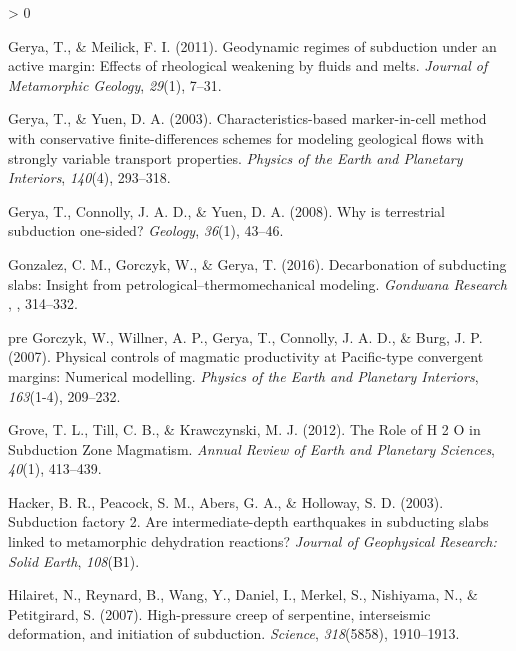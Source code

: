 \documentclass[draft,linenumbers]{agujournal2018}
\newlength{\cslhangindent}
\newenvironment{CSLReferences}[2] %
 {%
  \setlength{\parindent}{0pt}
  \ifodd #1 \everypar{\setlength{\hangindent}{\cslhangindent}}\ignorespaces\fi
  \ifnum #2 > 0
  \setlength{\parskip}{#2\baselineskip}
  \fi
 }%
 {}
\providecommand{\DIFaddtex}[1]{{\protect\color{blue} \sf #1}} %
\providecommand{\DIFaddbegin}{} %
\providecommand{\DIFaddend}{} %
\providecommand{\DIFadd}[1]{\texorpdfstring{\DIFaddtex{#1}}{#1}} %
\begin{document}
\begin{CSLReferences}{1}{0}
\leavevmode{}%
Gerya, T., \& Meilick, F. I. (2011). Geodynamic regimes of subduction
under an active margin: Effects of rheological weakening by fluids and
melts. \emph{Journal of Metamorphic Geology}, \emph{29}(1), 7--31.

\leavevmode{}%
Gerya, T., \& Yuen, D. A. (2003). {Characteristics-based marker-in-cell
method with conservative finite-differences schemes for modeling
geological flows with strongly variable transport properties}.
\emph{Physics of the Earth and Planetary Interiors}, \emph{140}(4),
293--318.

\leavevmode{}%
Gerya, T., Connolly, J. A. D., \& Yuen, D. A. (2008). {Why is
terrestrial subduction one-sided?} \emph{Geology}, \emph{36}(1), 43--46.

\leavevmode\vadjust pre{\DIFaddbegin \hypertarget{ref-Gonzalez2016}{}}%
\DIFadd{Gonzalez, C. M., Gorczyk, W., \& Gerya, T. (2016). Decarbonation of
subducting slabs: Insight from petrological--thermomechanical modeling.
}\emph{\DIFadd{Gondwana Research}}\DIFadd{, }\emph{\DIFadd{36}}\DIFadd{, 314--332.
}

\leavevmode\vadjust \DIFadd{pre}{\DIFaddend \hypertarget{ref-Gorczyk2007}{}}%
Gorczyk, W., Willner, A. P., Gerya, T., Connolly, J. A. D., \& Burg, J.
P. (2007). {Physical controls of magmatic productivity at Pacific-type
convergent margins: Numerical modelling}. \emph{Physics of the Earth and
Planetary Interiors}, \emph{163}(1-4), 209--232.

\leavevmode{}%
Grove, T. L., Till, C. B., \& Krawczynski, M. J. (2012). {The Role of H
2 O in Subduction Zone Magmatism}. \emph{Annual Review of Earth and
Planetary Sciences}, \emph{40}(1), 413--439.

\leavevmode{}%
Hacker, B. R., Peacock, S. M., Abers, G. A., \& Holloway, S. D. (2003).
{Subduction factory 2. Are intermediate-depth earthquakes in subducting
slabs linked to metamorphic dehydration reactions?} \emph{Journal of
Geophysical Research: Solid Earth}, \emph{108}(B1).

\leavevmode{}%
Hilairet, N., Reynard, B., Wang, Y., Daniel, I., Merkel, S., Nishiyama,
N., \& Petitgirard, S. (2007). High-pressure creep of serpentine,
interseismic deformation, and initiation of subduction. \emph{Science},
\emph{318}(5858), 1910--1913.


\end{CSLReferences}
\end{document}
